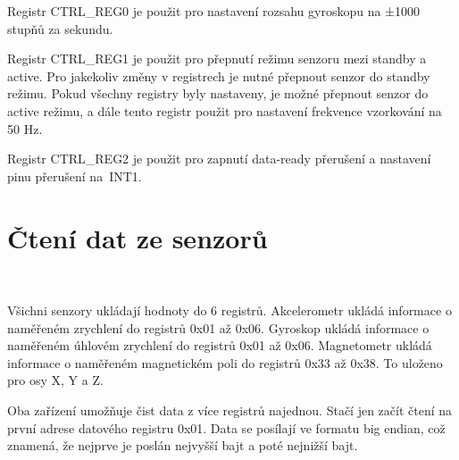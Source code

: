 Registr CTRL\_REG0 je použit pro nastavení rozsahu gyroskopu na ±1000 stupňů za sekundu.

Registr CTRL\_REG1 je použit pro přepnutí režimu senzoru mezi standby a active. Pro jakekoliv
změny v registrech je nutné přepnout senzor do standby režimu. Pokud všechny registry byly
nastaveny, je možné přepnout senzor do active režimu, a dále tento registr použit pro nastavení frekvence vzorkování na 50 Hz.

Registr CTRL\_REG2 je použit pro zapnutí data-ready přerušení a nastavení pinu přerušení
na~INT1\cite{FXAS21002}.

\section{Čtení dat ze senzorů}\

Všichni senzory ukládají hodnoty do 6 registrů. Akcelerometr ukládá informace o
naměřeném zrychlení do registrů 0x01 až 0x06. Gyroskop ukládá informace o naměřeném
úhlovém zrychlení do registrů 0x01 až 0x06. Magnetometr ukládá informace o naměřeném
magnetickém poli do registrů 0x33 až 0x38. To uloženo pro osy X, Y a Z.

Oba zařízení umožňuje čist data z více registrů najednou. Stačí jen
začít čtení na první adrese datového registru 0x01. Data se posílají ve formatu
big endian, což znamená, že nejprve je poslán nejvyšší bajt a poté nejnižší bajt.

\endinput
